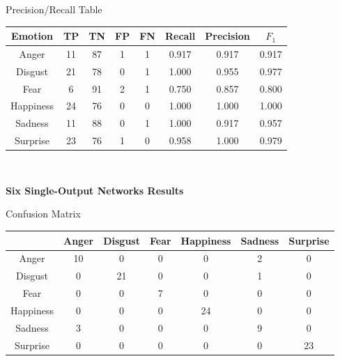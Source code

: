 \documentclass[a4paper]{article}
\begin{document}
   \begin{center}
  
  Precision/Recall Table\\
  
  \begin{tabular}{c|cccc|ccc}
    Emotion & TP & TN & FP & FN & Recall & Precision & $F_1$ \\
    \hline
    Anger & 11 & 87 & 1 & 1 & 0.917	& 0.917	& 0.917 \\
  Disgust & 21 & 78 & 0 & 1 & 1.000	& 0.955	& 0.977 \\
     Fear & 6 & 91 & 2 & 1 & 0.750	& 0.857	& 0.800 \\
Happiness & 24 & 76 & 0 & 0 & 1.000 & 1.000 & 1.000 \\
  Sadness & 11 & 88 & 0 & 1 & 1.000	& 0.917	& 0.957 \\
 Surprise & 23 & 76 & 1 & 0 & 0.958	& 1.000	& 0.979 \\
  \end{tabular}\\
  
 \end{center}
  
{\bf Six Single-Output Networks Results}

 \begin{center}

	Confusion Matrix\\

	\begin{tabular}{c|cccccc}
    & Anger & Disgust & Fear & Happiness & Sadness & Surprise \\
    \hline
    Anger & 10 & 0 & 0 & 0 & 2 & 0 \\
  Disgust & 0 & 21 & 0 & 0 & 1 & 0 \\
     Fear & 0 & 0 & 7 & 0 & 0 & 0 \\
Happiness & 0 & 0 & 0 & 24 & 0 & 0 \\
  Sadness & 3 & 0 & 0 & 0 & 9 & 0 \\
 Surprise & 0 & 0 & 0 & 0 & 0 & 23 \\
  \end{tabular}\\
  \end{center}
  
\end{document}
